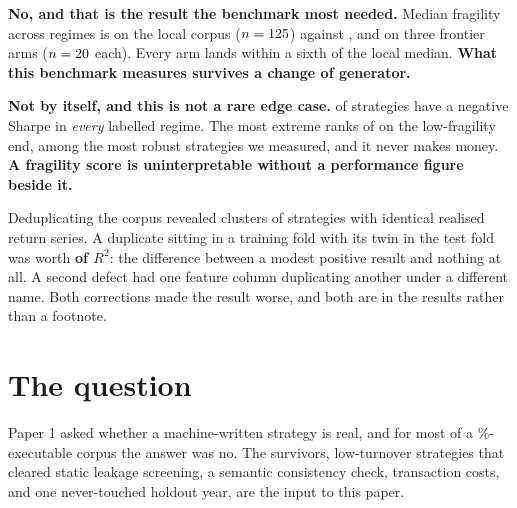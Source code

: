 \documentclass[11pt,a4paper]{article}
\begin{document}
\begin{finding}[title={4.\ \ Does fragility depend on who wrote the strategy? \hfill\tagindep}]
\textbf{No, and that is the result the benchmark most needed.} Median fragility across regimes is
\rsGvLocalRegimeMedian{} on the local corpus ($n=125{}$) against
\rsGvGptRegimeMedian{}, \rsGvClaudeRegimeMedian{} and \rsGvGeminiRegimeMedian{} on three frontier
arms ($n=20{}$ each). Every arm lands within a sixth of the local median.
\textbf{What this benchmark measures survives a change of generator.}
\end{finding}

\begin{finding}[title={5.\ \ Is a low fragility score good news? \hfill\taglocal}]
\textbf{Not by itself, and this is not a rare edge case.} \rsUniformlyBadCount{} of
\rsNPrimary{} strategies have a negative Sharpe in \emph{every} labelled regime. The most extreme
ranks \rsUniformlyBadRank{} of \rsNPrimary{} on the low-fragility end, among the most robust
strategies we measured, and it never makes money. \textbf{A fragility score is uninterpretable
without a performance figure beside it.}
\end{finding}

\begin{finding}[title={6.\ \ Our own first answer was better, and wrong. \hfill\tagexpl}]
Deduplicating the corpus revealed \rsDuplicateClusters{} clusters of strategies with identical
realised return series. A duplicate sitting in a training fold with its twin in the test fold was
worth \textbf{\rsLeakageDelta{} of $R^2$}: the difference between a modest positive result and
nothing at all. A second defect had one feature column duplicating another under a different name.
Both corrections made the result worse, and both are in the results rather than a footnote.
\end{finding}

\vspace{0.6em}
\trilogymap

\clearpage
{\hypersetup{linkcolor=navy}\tableofcontents}
\clearpage

\section{The question}
\label{sec:question}

Paper 1 asked whether a machine-written strategy is real, and for most of a
\pgmLocalTrade\%-executable corpus the answer was no. The survivors, low-turnover strategies
that cleared static leakage screening, a semantic consistency check, transaction costs, and one
never-touched holdout year, are the input to this paper.
\end{document}
